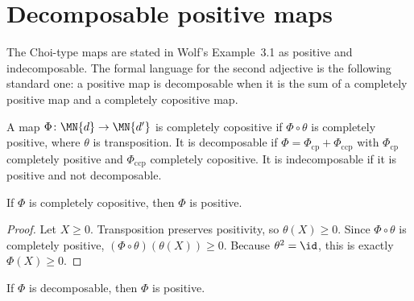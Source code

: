 \section{Decomposable positive maps}

The Choi-type maps are stated in Wolf's Example~3.1 as positive and
indecomposable. The formal language for the second adjective is the following
standard one: a positive map is decomposable when it is the sum of a completely
positive map and a completely copositive map.

\begin{definition}
    \label{def:decomposable_positive_map}
    \leanok
    A map $\Phi\colon\MN{d}\to\MN{d'}$ is completely copositive if
    $\Phi\circ\theta$ is completely positive, where $\theta$ is transposition.
    It is decomposable if
    $\Phi=\Phi_{\mathrm{cp}}+\Phi_{\mathrm{ccp}}$ with
    $\Phi_{\mathrm{cp}}$ completely positive and
    $\Phi_{\mathrm{ccp}}$ completely copositive. It is indecomposable if it is
    positive and not decomposable.
\end{definition}

\begin{lemma}
    \label{lem:completely_copositive_map_positive}
    \leanok
    If $\Phi$ is completely copositive, then $\Phi$ is positive.
\end{lemma}

\begin{proof}
    \leanok
    Let $X\ge0$. Transposition preserves positivity, so $\theta(X)\ge0$.
    Since $\Phi\circ\theta$ is completely positive,
    $(\Phi\circ\theta)(\theta(X))\ge0$. Because $\theta^2=\id$, this is exactly
    $\Phi(X)\ge0$.
\end{proof}

\begin{lemma}
    \label{lem:decomposable_map_positive}
    \leanok
    If $\Phi$ is decomposable, then $\Phi$ is positive.
\end{lemma}

